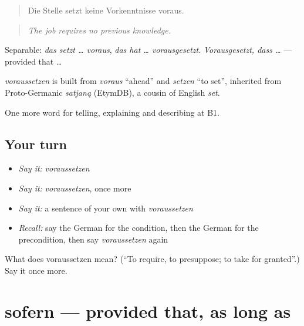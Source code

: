 \begin{quote}
Die Stelle setzt keine Vorkenntnisse voraus.
\end{quote}

\begin{quote}
\emph{The job requires no previous knowledge.}
\end{quote}

Separable: \emph{das setzt … voraus}, \emph{das hat … vorausgesetzt}. \emph{Vorausgesetzt, dass …} — provided that …

\begin{cousinweb}
\emph{voraussetzen} is built from \emph{voraus} \textquotedblleft{}ahead\textquotedblright{} and \emph{setzen} \textquotedblleft{}to set\textquotedblright{}, inherited from Proto-Germanic \emph{satjaną} (EtymDB), a cousin of English \emph{set}.
\end{cousinweb}

\begin{grammarlens}[title={What you've built}]
One more word for telling, explaining and describing at B1.
\end{grammarlens}

\subsection*{Your turn}
\begin{itemize}
\raggedright
  \item \emph{Say it:} \emph{voraussetzen}
  \item \emph{Say it:} \emph{voraussetzen}, once more
  \item \emph{Say it:} a sentence of your own with \emph{voraussetzen}
  \item \emph{Recall:} say the German for the condition, then the German for the precondition, then say \emph{voraussetzen} again
\end{itemize}

\begin{tcolorbox}[breakable,colback=teal!4,colframe=teal!35!black,title={Before you move on}]
What does voraussetzen mean? (\textquotedblleft{}To require, to presuppose; to take for granted\textquotedblright{}.) Say it once more.
\end{tcolorbox}
\section[sofern]{sofern — provided that, as long as}

\label{lesson:GE-C364-sofern}



